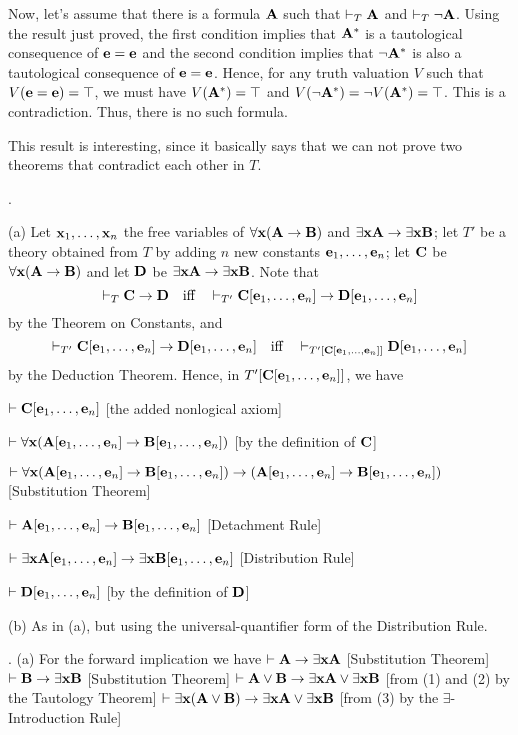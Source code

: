 Now, let's assume that there is a formula ${\bf A}$ such that $\vdash_{T} {\bf A}$ and $\vdash_{T} \neg {\bf A}$.
Using the result just proved, the first condition implies that ${\bf A}^*$ is a tautological
consequence of ${\bf e}={\bf e}$ and the second condition implies that $\neg {\bf A}^*$ is also a 
tautological consequence of ${\bf e}={\bf e}$. Hence, for any truth valuation $V$ such that 
$V({\bf e}={\bf e}) = \top$, we must have $V({\bf A}^*) = \top$ and $V(\neg {\bf A}^*) = \neg V({\bf A}^*) = \top$.
This is a contradiction. Thus, there is no such formula.

This result is interesting, since it basically says that we can not prove two theorems 
that contradict each other in $T$.
\medskip

. 

\ansitem (a)
Let ${\bf x}_1, \dots, {\bf x}_n$ the free variables of $\forall{\bf x}({\bf A} \to {\bf B})$ and $\exists{\bf x}{\bf A} \to \exists{\bf x}{\bf B}$; 
let $T'$ be a theory obtained from $T$ by adding $n$ new constants ${\bf e}_1, \dots, {\bf e}_n$; 
let ${\bf C}$ be $\forall{\bf x}({\bf A} \to {\bf B})$ and let ${\bf D}$ be $\exists{\bf x}{\bf A} \to \exists{\bf x}{\bf B}$.
Note that
$$
\vdash_T {\bf C} \to {\bf D} \quad\hbox{iff}\quad \vdash_{T'} {\bf C}[{\bf e}_1, \dots, {\bf e}_n] \to {\bf D}[{\bf e}_1, \dots, {\bf e}_n]
$$
by the Theorem on Constants, and
$$
\vdash_{T'} {\bf C}[{\bf e}_1, \dots, {\bf e}_n] \to {\bf D}[{\bf e}_1, \dots, {\bf e}_n] \quad\hbox{iff}\quad \vdash_{T'[{\bf C}[{\bf e}_1, \dots, {\bf e}_n]]} {\bf D}[{\bf e}_1, \dots, {\bf e}_n] 
$$
by the Deduction Theorem. Hence, in $T'[{\bf C}[{\bf e}_1, \dots, {\bf e}_n]]$, we have
\item{} $\vdash {\bf C}[{\bf e}_1, \dots, {\bf e}_n]$ \hfill [the added nonlogical axiom]
\item{} $\vdash \forall{\bf x}({\bf A}[{\bf e}_1, \dots, {\bf e}_n] \to {\bf B}[{\bf e}_1, \dots, {\bf e}_n])$ \hfill [by the definition of ${\bf C}$]
\item{} $\vdash \forall{\bf x}({\bf A}[{\bf e}_1, \dots, {\bf e}_n] \to {\bf B}[{\bf e}_1, \dots, {\bf e}_n]) \to ({\bf A}[{\bf e}_1, \dots, {\bf e}_n] \to {\bf B}[{\bf e}_1, \dots, {\bf e}_n])$ \hfill [Substitution Theorem]
\item{} $\vdash {\bf A}[{\bf e}_1, \dots, {\bf e}_n] \to {\bf B}[{\bf e}_1, \dots, {\bf e}_n]$ \hfill [Detachment Rule]
\item{} $\vdash \exists{\bf x}{\bf A}[{\bf e}_1, \dots, {\bf e}_n] \to \exists{\bf x}{\bf B}[{\bf e}_1, \dots, {\bf e}_n]$ \hfill [Distribution Rule]
\item{} $\vdash {\bf D}[{\bf e}_1, \dots, {\bf e}_n]$ \hfill [by the definition of ${\bf D}$]
\smallskip 

\ansitem (b) As in (a), but using the universal-quantifier form of the Distribution Rule.
\medskip

.
\ansitem (a) For the forward implication we have
 $\vdash {\bf A} \to \exists{\bf x}{\bf A}$ \hfill [Substitution Theorem]
 $\vdash {\bf B} \to \exists{\bf x}{\bf B}$ \hfill [Substitution Theorem]
 $\vdash {\bf A} \lor {\bf B} \to \exists{\bf x}{\bf A} \lor \exists{\bf x}{\bf B}$ \hfill [from (1) and (2) by the Tautology Theorem]
 $\vdash \exists{\bf x}({\bf A} \lor {\bf B}) \to \exists{\bf x}{\bf A} \lor \exists{\bf x}{\bf B}$ \hfill [from (3) by the $\exists$-Introduction Rule]


